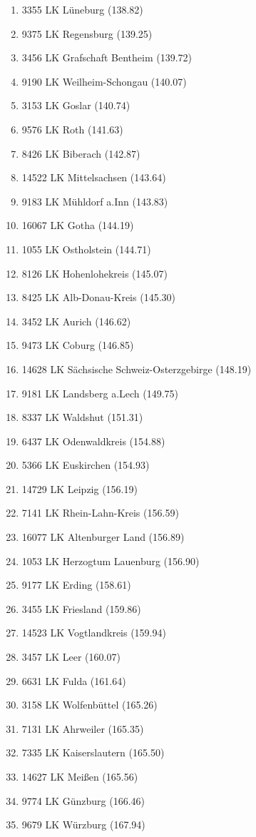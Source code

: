 \begin{enumerate}[itemsep=-6mm]
\item 3355 LK Lüneburg (138.82)
\item 9375 LK Regensburg (139.25)
\item 3456 LK Grafschaft Bentheim (139.72)
\item 9190 LK Weilheim-Schongau (140.07)
\item 3153 LK Goslar (140.74)
\item 9576 LK Roth (141.63)
\item 8426 LK Biberach (142.87)
\item 14522 LK Mittelsachsen (143.64)
\item 9183 LK Mühldorf a.Inn (143.83)
\item 16067 LK Gotha (144.19)
\item 1055 LK Ostholstein (144.71)
\item 8126 LK Hohenlohekreis (145.07)
\item 8425 LK Alb-Donau-Kreis (145.30)
\item 3452 LK Aurich (146.62)
\item 9473 LK Coburg (146.85)
\item 14628 LK Sächsische Schweiz-Osterzgebirge (148.19)
\item 9181 LK Landsberg a.Lech (149.75)
\item 8337 LK Waldshut (151.31)
\item 6437 LK Odenwaldkreis (154.88)
\item 5366 LK Euskirchen (154.93)
\item 14729 LK Leipzig (156.19)
\item 7141 LK Rhein-Lahn-Kreis (156.59)
\item 16077 LK Altenburger Land (156.89)
\item 1053 LK Herzogtum Lauenburg (156.90)
\item 9177 LK Erding (158.61)
\item 3455 LK Friesland (159.86)
\item 14523 LK Vogtlandkreis (159.94)
\item 3457 LK Leer (160.07)
\item 6631 LK Fulda (161.64)
\item 3158 LK Wolfenbüttel (165.26)
\item 7131 LK Ahrweiler (165.35)
\item 7335 LK Kaiserslautern (165.50)
\item 14627 LK Meißen (165.56)
\item 9774 LK Günzburg (166.46)
\item 9679 LK Würzburg (167.94)

\end{enumerate}
